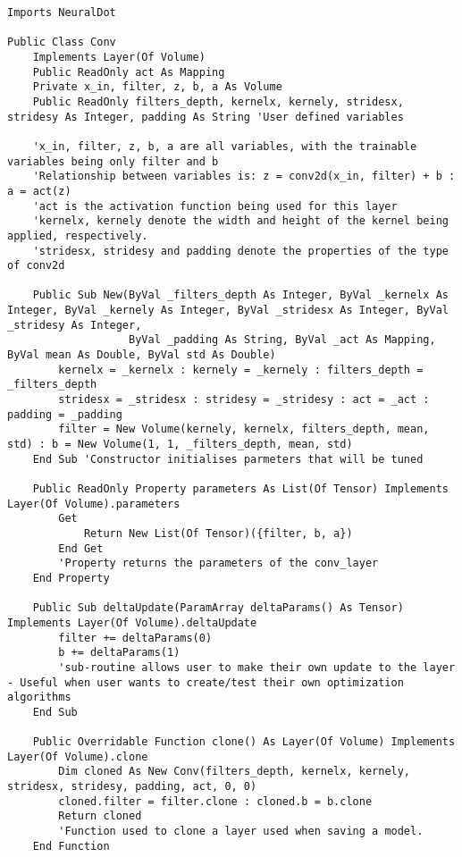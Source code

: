 \begin{verbatim}
Imports NeuralDot

Public Class Conv
    Implements Layer(Of Volume)
    Public ReadOnly act As Mapping
    Private x_in, filter, z, b, a As Volume
    Public ReadOnly filters_depth, kernelx, kernely, stridesx, stridesy As Integer, padding As String 'User defined variables

    'x_in, filter, z, b, a are all variables, with the trainable variables being only filter and b
    'Relationship between variables is: z = conv2d(x_in, filter) + b : a = act(z)
    'act is the activation function being used for this layer
    'kernelx, kernely denote the width and height of the kernel being applied, respectively.
    'stridesx, stridesy and padding denote the properties of the type of conv2d

    Public Sub New(ByVal _filters_depth As Integer, ByVal _kernelx As Integer, ByVal _kernely As Integer, ByVal _stridesx As Integer, ByVal _stridesy As Integer,
                   ByVal _padding As String, ByVal _act As Mapping, ByVal mean As Double, ByVal std As Double)
        kernelx = _kernelx : kernely = _kernely : filters_depth = _filters_depth
        stridesx = _stridesx : stridesy = _stridesy : act = _act : padding = _padding
        filter = New Volume(kernely, kernelx, filters_depth, mean, std) : b = New Volume(1, 1, _filters_depth, mean, std)
    End Sub 'Constructor initialises parmeters that will be tuned

    Public ReadOnly Property parameters As List(Of Tensor) Implements Layer(Of Volume).parameters
        Get
            Return New List(Of Tensor)({filter, b, a})
        End Get
        'Property returns the parameters of the conv_layer
    End Property

    Public Sub deltaUpdate(ParamArray deltaParams() As Tensor) Implements Layer(Of Volume).deltaUpdate
        filter += deltaParams(0)
        b += deltaParams(1)
        'sub-routine allows user to make their own update to the layer - Useful when user wants to create/test their own optimization algorithms
    End Sub

    Public Overridable Function clone() As Layer(Of Volume) Implements Layer(Of Volume).clone
        Dim cloned As New Conv(filters_depth, kernelx, kernely, stridesx, stridesy, padding, act, 0, 0)
        cloned.filter = filter.clone : cloned.b = b.clone
        Return cloned
        'Function used to clone a layer used when saving a model.
    End Function


\end{verbatim}
